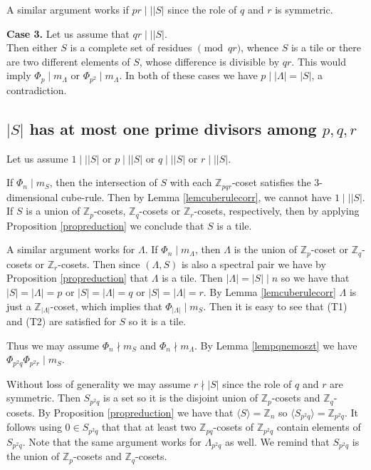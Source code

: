 \documentclass[10pt]{article}
\newcommand{\Z}{\mathbb{Z}}
\newcommand{\La}{\Lambda}
\begin{document}
        A similar argument works if $pr \mid \mid |S|$ since the role of $q$ and $r$ is symmetric.
        
        
        
        
        
        
        
        
        {\bf Case 3.}
        Let us assume that $qr \mid\mid |S|$. \\
        Then either $S$ is a complete set of residues $\pmod{qr}$, whence $S$ is a tile or there are two different elements of $S$, whose difference is divisible by $qr$. This would imply $\Phi_p  \mid m_{\La}$ or $\Phi_{p^2}  \mid m_{\La}$. In both of these cases we have $p  \mid |\La|=|S|$, a contradiction. 
        
        \subsection{$|S|$ has at most one prime divisors among $p,q,r$}
        Let us assume $1 \mid\mid |S|$ or $p \mid\mid |S|$ or $q \mid\mid |S|$ or $r \mid\mid |S|$. 
        
        If $\Phi_n \mid m_S$, then the intersection of $S$ with each $\Z_{pqr}$-coset satisfies the $3$-dimensional cube-rule. 
        Then by Lemma \ref{lemcuberulecorr}, we cannot have $1 \mid\mid |S|$. If $S$ is a union of $\Z_p$-cosets, $\Z_q$-cosets or $\Z_r$-cosets, respectively, then by applying Proposition \ref{propreduction} we conclude that $S$ is a tile. 
        
        A similar argument works for $\La$. If $\Phi_n \mid m_{\La}$, then $\La$ is the union of $\Z_p$-coset or $\Z_q$-cosets or $\Z_r$-cosets. Then since $(\La,S)$ is also a spectral pair we 
        have by Proposition \ref{propreduction} that $\La$ is a tile. Then $|\La| = |S|\mid n$ so we have that $|S|=|\La|=p$ or $|S|=|\La|=q$ or $|S|=|\La|=r$. By Lemma  \ref{lemcuberulecorr} $\La$ is just a $\Z_{|\La|}$-coset, which implies that $\Phi_{|\La|} \mid m_S$. Then it is easy to see that (T1) and (T2) are satisfied for $S$ so it is a tile.
        
        Thus we may assume $\Phi_n \nmid m_S$ and    $\Phi_n \nmid m_{\La}$.
        By Lemma \ref{lempqnemoszt} we have $\Phi_{p^2q} \Phi_{p^2r}\mid m_{S}$.
        
        Without loss of generality we may assume $r \nmid |S|$ since the role of $q$ and $r$ are symmetric. 
        Then $S_{p^2q}$ is a set so it is the disjoint union of $\Z_p$-cosets and $\Z_q$-cosets. 
        By Proposition \ref{propreduction} we have that $\langle S \rangle= \Z_n$ so $\langle S_{p^2q} \rangle= \Z_{p^2q}$. It follows using $0 \in S_{p^2q}$ that that at least two $\Z_{pq}$-cosets of $\Z_{p^2q}$ contain elements of $S_{p^2q}$.
        Note that the same argument works for $\La_{p^2q}$ as well.
        We remind that $S_{p^2q}$
        is the union of $\Z_p$-cosets and $\Z_q$-cosets. 
        
\end{document}
